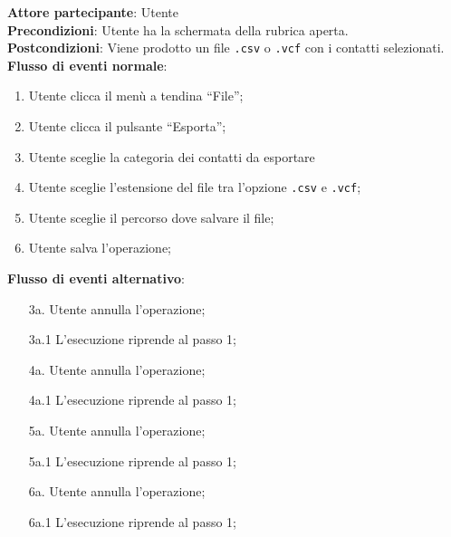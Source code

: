 \begin{tcolorbox}[colback=white,colframe=black!80!white,title=\textbf{C6 - Esportare rubrica}]
	\textbf{Attore partecipante}: Utente
	\\\textbf{Precondizioni}: Utente ha la schermata della rubrica aperta.
	\\\textbf{Postcondizioni}: Viene prodotto un file \texttt{.csv} o \texttt{.vcf} con i contatti selezionati.
	\\\textbf{Flusso di eventi normale}:
	\begin{enumerate}[noitemsep, topsep=0pt]
		\item Utente clicca il menù a tendina “File”;
		\item Utente clicca il pulsante “Esporta”;
		\item Utente sceglie la categoria dei contatti da esportare
		\item Utente sceglie l’estensione del file tra l’opzione \texttt{.csv} e \texttt{.vcf};
		\item Utente sceglie il percorso dove salvare il file;
		\item Utente salva l’operazione;	
	\end{enumerate}
	\textbf{Flusso di eventi alternativo}:
	\begin{itemize}[noitemsep, topsep=0pt]
		\item[3a. ] Utente annulla l’operazione;
		\item[3a.1] L’esecuzione riprende al passo 1;
		\item[4a. ] Utente annulla l’operazione;
		\item[4a.1] L’esecuzione riprende al passo 1;
		\item[5a. ] Utente annulla l’operazione;
		\item[5a.1] L’esecuzione riprende al passo 1;
		\item[6a. ] Utente annulla l’operazione;
		\item[6a.1] L’esecuzione riprende al passo 1;	
	\end{itemize}
\end{tcolorbox}

